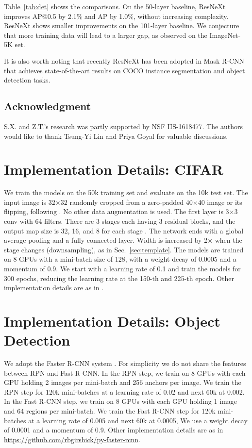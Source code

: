\documentclass[10pt,twocolumn,letterpaper]{article}
\begin{document}
Table~\ref{tab:det} shows the comparisons. On the 50-layer baseline, ResNeXt improves AP@0.5 by 2.1\% and AP by 1.0\%, without increasing complexity. ResNeXt shows smaller improvements on the 101-layer baseline. We conjecture that more training data will lead to a larger gap, as observed on the ImageNet-5K set.

It is also worth noting that recently ResNeXt has been adopted in Mask R-CNN \cite{he2017mask} that achieves state-of-the-art results on COCO instance segmentation and object detection tasks. 


\subsection*{Acknowledgment} S.X. and Z.T.'s research was partly supported by NSF IIS-1618477. The authors would like to thank Tsung-Yi Lin and Priya Goyal for valuable discussions.

\appendix

\section{Implementation Details: CIFAR}
\label{app:cifar}

We train the models on the 50k training set and evaluate on the 10k test set.
The input image is 32$\times$32 randomly cropped from a zero-padded 40$\times$40 image or its flipping, following \cite{He2016}.
No other data augmentation is used.
The first layer is 3$\times$3 conv with 64 filters.
There are 3 stages each having 3 residual blocks, and the output map size is 32, 16, and 8 for each stage \cite{He2016}.
The network ends with a global average pooling and a fully-connected layer.
Width is increased by 2$\times$ when the stage changes (downsampling), as in Sec.~\ref{sec:template}.
The models are trained on 8 GPUs with a mini-batch size of 128, with a weight decay of 0.0005 and a momentum of 0.9.
We start with a learning rate of 0.1 and train the models for 300 epochs, reducing the learning rate at the 150-th and 225-th epoch.
Other implementation details are as in \cite{Gross2016}.

\section{Implementation Details: Object Detection}
\label{app:det}

We adopt the Faster R-CNN system \cite{Ren2015}.
For simplicity we do not share the features between RPN and Fast R-CNN.
In the RPN step, we train on 8 GPUs with each GPU holding 2 images per mini-batch and 256 anchors per image.
We train the RPN step for 120k mini-batches at a learning rate of 0.02 and next 60k at 0.002.
In the Fast R-CNN step, we train on 8 GPUs with each GPU holding 1 image and 64 regions per mini-batch. 
We train the Fast R-CNN step for 120k mini-batches at a learning rate of 0.005 and next 60k at 0.0005,
We use a weight decay of 0.0001 and a momentum of 0.9. 
Other implementation details are as in \url{https://github.com/rbgirshick/py-faster-rcnn}.

{%


}
\end{document}
